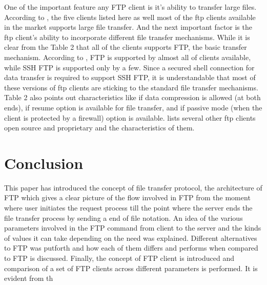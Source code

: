 \documentclass[9pt,twocolumn,twoside]{styles/osajnl}
\begin{document}
One of the important feature any FTP client is it's ability to transfer large files. According to \cite{www-wiki-ftpclientcomp}, the five clients listed here as well most of the ftp clients available in the market supports large file transfer. And the next important factor is the ftp client's ability to incorporate different file transfer mechanisms. While it is clear from the Table 2 that all of the clients supports FTP, the basic transfer mechanism. According to \cite{www-wiki-ftpclientcomp}, FTP is supported by almost all of clients available, while SSH FTP is supported only by a few. Since a secured shell connection for data transfer is required to support SSH FTP, it is understandable that most of these versions of ftp clients are sticking to the standard file transfer mechanisms. Table 2 also points out characteristics like if data compression is allowed (at both ends), if resume option is available for file transfer, and if passive mode (when the client is protected by a firewall) option is available. \cite{www-wiki-ftpclientcomp} lists several other ftp clients open source and proprietary and the characteristics of them.

\section{Conclusion}

This paper has introduced the concept of file transfer protocol, the architecture of FTP which gives a clear picture of the flow involved in FTP from the moment where user initiates the request process till the point where the server ends the file transfer process by sending a end of file notation. An idea of the various parameters involved in the FTP command from client to the server and the kinds of values it can take depending on the need was explained. Different alternatives to FTP was putforth and how each of them differs and performs when compared to FTP is discussed. Finally, the concept of FTP client is introduced and comparison of a set of FTP clients across different parameters is performed. It is evident from th


\end{document}
